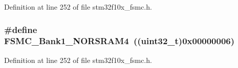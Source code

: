 Definition at line 252 of file stm32f10x\+\_\+fsmc.\+h.

\subsubsection[{\texorpdfstring{F\+S\+M\+C\+\_\+\+Bank1\+\_\+\+N\+O\+R\+S\+R\+A\+M4}{FSMC_Bank1_NORSRAM4}}]{\setlength{\rightskip}{0pt plus 5cm}\#define F\+S\+M\+C\+\_\+\+Bank1\+\_\+\+N\+O\+R\+S\+R\+A\+M4~(({\bf uint32\+\_\+t})0x00000006)}\hypertarget{group___f_s_m_c___n_o_r_s_r_a_m___bank_ga1083572834aa084d21e6698c280f8f74}{}\label{group___f_s_m_c___n_o_r_s_r_a_m___bank_ga1083572834aa084d21e6698c280f8f74}


Definition at line 252 of file stm32f10x\+\_\+fsmc.\+h.

